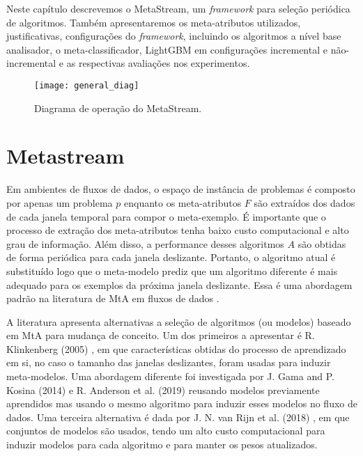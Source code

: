 \label{chap:metodologia}
Neste capítulo descrevemos o MetaStream, um \textit{framework} para seleção periódica de algoritmos. Também apresentaremos os meta-atributos utilizados, justificativas, configurações do \textit{framework}, incluindo os algoritmos a nível base analisador, o meta-classificador, LightGBM em configurações incremental e não-incremental e as respectivas avaliações nos experimentos.

\begin{figure}[ht]
    \centering
    \texttt{[image: general\_diag]}
    \caption{Diagrama de operação do MetaStream.}
    \label{fig:general_diag}
\end{figure}

\section{Metastream}
\label{sec:metastream}

Em ambientes de fluxos de dados, o espaço de instância de problemas é composto
por apenas um problema $p$ enquanto os meta-atributos $F$ são extraídos dos
dados de cada janela temporal para compor o meta-exemplo.
É importante que o processo de extração dos meta-atributos tenha baixo custo
computacional e alto grau de informação.
Além disso, a  performance desses algoritmos $A$ são obtidas de forma periódica para cada janela deslizante. Portanto, o algoritmo atual é substituído logo que o meta-modelo prediz que um
algoritmo diferente é mais adequado para os exemplos da próxima janela
deslizante. Essa é uma abordagem padrão na literatura de MtA em fluxos de dados
\cite{read2012batch, vanrijn2014algorithm, Anderson2019}.

A literatura apresenta alternativas a seleção de algoritmos (ou modelos)
baseado em MtA para mudança de conceito. Um dos primeiros a apresentar é R.
Klinkenberg (2005) \cite{klinkenberg2005}, em que características obtidas do
processo de aprendizado em si, no caso o tamanho das janelas deslizantes, foram
usadas para induzir meta-modelos.
Uma abordagem diferente foi investigada por J. Gama and P. Kosina (2014)
\cite{gama2014} e R. Anderson et al. (2019) \cite{Anderson2019}
reusando modelos previamente aprendidos mas usando o mesmo algoritmo para
induzir esses modelos no fluxo de dados. Uma terceira alternativa é dada por J.
N. van Rijn et al. (2018) \cite{VanRijn2018}, em que conjuntos de
modelos são usados, tendo um alto custo computacional para induzir modelos para cada
algoritmo e para manter os pesos atualizados.

